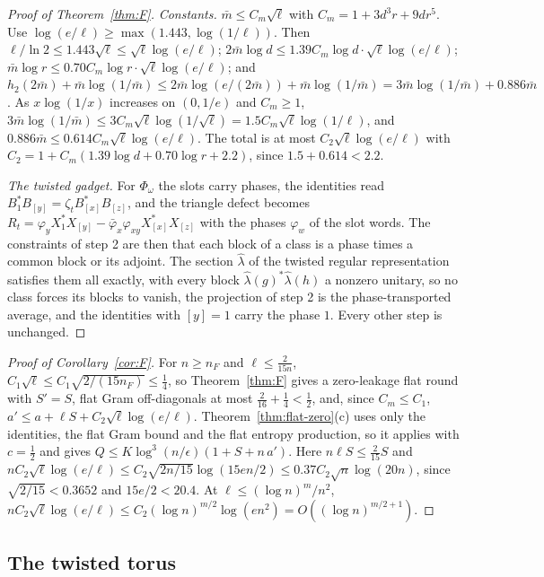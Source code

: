 \begin{proof}[Proof of Theorem~\ref{thm:F}]
\emph{Constants.} $\bar m\le C_m\sqrt\ell$ with $C_m=1+3d^3r+9dr^5$. Use $\log(e/\ell)\ge\max(1.443,\log(1/\ell))$. Then $\ell/\ln2\le1.443\sqrt\ell\le\sqrt\ell\log(e/\ell)$;
$2\bar m\log d\le1.39C_m\log d\cdot\sqrt\ell\log(e/\ell)$; $\bar m\log r\le0.70C_m\log r\cdot\sqrt\ell\log(e/\ell)$; and
$h_2(2\bar m)+\bar m\log(1/\bar m)\le2\bar m\log(e/(2\bar m))+\bar m\log(1/\bar m)=3\bar m\log(1/\bar m)+0.886\bar m$. As $x\log(1/x)$ increases on $(0,1/e)$ and $C_m\ge1$,
$3\bar m\log(1/\bar m)\le3C_m\sqrt\ell\log(1/\sqrt\ell)=1.5C_m\sqrt\ell\log(1/\ell)$, and $0.886\bar m\le0.614C_m\sqrt\ell\log(e/\ell)$. The total is at most
$C_2\sqrt\ell\log(e/\ell)$ with $C_2=1+C_m(1.39\log d+0.70\log r+2.2)$, since $1.5+0.614<2.2$.

\emph{The twisted gadget.} For $\Phi_\omega$ the slots carry phases, the identities read $B_1^*B_{[y]}=\zeta_tB_{[x]}^*B_{[z]}$, and the triangle defect becomes
$R_t=\varphi_yX_1^*X_{[y]}-\bar\varphi_x\varphi_{xy}X_{[x]}^*X_{[z]}$ with the phases $\varphi_w$ of the slot words. The constraints of step 2 are then that each block of a
class is a phase times a common block or its adjoint. The section $\hat\lambda$ of the twisted regular representation satisfies them all exactly, with every block
$\hat\lambda(g)^*\hat\lambda(h)$ a nonzero unitary, so no class forces its blocks to vanish, the projection of step 2 is the phase-transported average, and the identities
with $[y]=1$ carry the phase $1$. Every other step is unchanged.
\end{proof}

\begin{proof}[Proof of Corollary~\ref{cor:F}]
For $n\ge n_F$ and $\ell\le\frac2{15n}$, $C_1\sqrt\ell\le C_1\sqrt{2/(15n_F)}\le\frac14$, so Theorem~\ref{thm:F} gives a zero-leakage flat round with $S'=S$, flat Gram
off-diagonals at most $\frac2{16}+\frac14<\frac12$, and, since $C_m\le C_1$, $a'\le a+\ell S+C_2\sqrt\ell\log(e/\ell)$. Theorem~\ref{thm:flat-zero}(c) uses only the
identities, the flat Gram bound and the flat entropy production, so it applies with $c=\frac12$ and gives $Q\le K\log^3(n/\epsilon)(1+S+n\,a')$. Here
$n\ell S\le\frac2{15}S$ and $nC_2\sqrt\ell\log(e/\ell)\le C_2\sqrt{2n/15}\log(15en/2)\le0.37C_2\sqrt n\log(20n)$, since $\sqrt{2/15}<0.3652$ and $15e/2<20.4$. At
$\ell\le(\log n)^m/n^2$, $nC_2\sqrt\ell\log(e/\ell)\le C_2(\log n)^{m/2}\log(en^2)=O((\log n)^{m/2+1})$.
\end{proof}

\subsection{The twisted torus}

